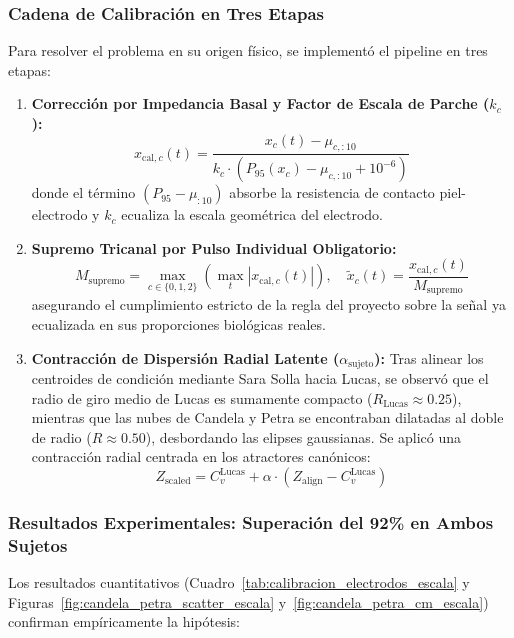 \documentclass[11pt,a4paper,openany]{book}
\theoremstyle{definition}
\begin{document}
\subsubsection{Cadena de Calibración en Tres Etapas}
Para resolver el problema en su origen físico, se implementó el pipeline en tres etapas:
\begin{enumerate}
    \item \textbf{Corrección por Impedancia Basal y Factor de Escala de Parche ($k_c$):}
    \begin{equation}
    x_{\text{cal}, c}(t) = \frac{x_c(t) - \mu_{c,:10}}{k_c \cdot (P_{95}(x_c) - \mu_{c,:10} + 10^{-6})}
    \end{equation}
    donde el término $(P_{95} - \mu_{:10})$ absorbe la resistencia de contacto piel-electrodo y $k_c$ ecualiza la escala geométrica del electrodo.
    \item \textbf{Supremo Tricanal por Pulso Individual Obligatorio:}
    \begin{equation}
    M_{\text{supremo}} = \max_{c \in \{0, 1, 2\}} \left( \max_t |x_{\text{cal}, c}(t)| \right), \quad \tilde{x}_c(t) = \frac{x_{\text{cal}, c}(t)}{M_{\text{supremo}}}
    \end{equation}
    asegurando el cumplimiento estricto de la regla del proyecto sobre la señal ya ecualizada en sus proporciones biológicas reales.
    \item \textbf{Contracción de Dispersión Radial Latente ($\alpha_{\text{sujeto}}$):}
    Tras alinear los centroides de condición mediante Sara Solla hacia Lucas, se observó que el radio de giro medio de Lucas es sumamente compacto ($R_{\text{Lucas}} \approx 0.25$), mientras que las nubes de Candela y Petra se encontraban dilatadas al doble de radio ($R \approx 0.50$), desbordando las elipses gaussianas. Se aplicó una contracción radial centrada en los atractores canónicos:
    \begin{equation}
    Z_{\text{scaled}} = C_v^{\text{Lucas}} + \alpha \cdot (Z_{\text{align}} - C_v^{\text{Lucas}})
    \end{equation}
\end{enumerate}

\subsubsection{Resultados Experimentales: Superación del 92\% en Ambos Sujetos}
Los resultados cuantitativos (Cuadro~\ref{tab:calibracion_electrodos_escala} y Figuras~\ref{fig:candela_petra_scatter_escala} y~\ref{fig:candela_petra_cm_escala}) confirman empíricamente la hipótesis:
\end{document}
